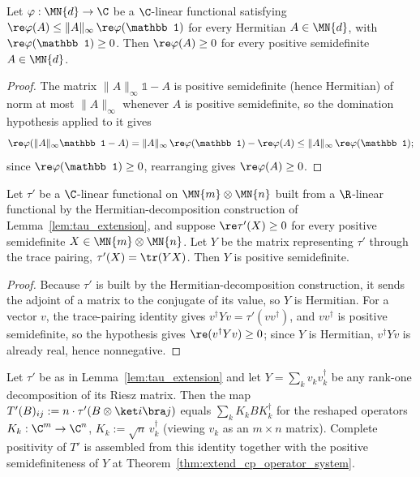 \begin{lemma}
    \label{lem:tau_nonneg}
    \leanok
    Let $\varphi:\MN{d}\to\C$ be a $\C$-linear functional satisfying
    $\re\varphi(A)\le\|A\|_\infty\,\re\varphi(\mathbb1)$ for every Hermitian
    $A\in\MN{d}$, with $\re\varphi(\mathbb1)\ge0$. Then $\re\varphi(A)\ge0$ for
    every positive semidefinite $A\in\MN{d}$.
\end{lemma}

\begin{proof}\leanok
    The matrix $\|A\|_\infty\mathbb1-A$ is positive semidefinite (hence
    Hermitian) of norm at most $\|A\|_\infty$ whenever $A$ is positive
    semidefinite, so the domination hypothesis applied to it gives
    \[
        \re\varphi(\|A\|_\infty\mathbb1-A)
        =\|A\|_\infty\,\re\varphi(\mathbb1)-\re\varphi(A)
        \le\|A\|_\infty\,\re\varphi(\mathbb1);
    \]
    since $\re\varphi(\mathbb1)\ge0$, rearranging gives $\re\varphi(A)\ge0$.
\end{proof}

\begin{lemma}
    \label{lem:riesz_psd}
    \leanok
    Let $\tau'$ be a $\C$-linear functional on $\MN{m}\otimes\MN{n}$ built
    from a $\R$-linear functional by the Hermitian-decomposition
    construction of Lemma~\ref{lem:tau_extension}, and suppose
    $\re\tau'(X)\ge0$ for every positive semidefinite
    $X\in\MN{m}\otimes\MN{n}$. Let $Y$ be the matrix representing $\tau'$
    through the trace pairing, $\tau'(X)=\tr(YX)$. Then $Y$ is positive
    semidefinite.
\end{lemma}

\begin{proof}\leanok
    Because $\tau'$ is built by the Hermitian-decomposition construction,
    it sends the adjoint of a matrix to the conjugate of its value, so $Y$
    is Hermitian. For a vector $v$, the trace-pairing identity gives
    $v^\dagger Yv=\tau'(vv^\dagger)$, and $vv^\dagger$ is positive
    semidefinite, so the hypothesis gives $\re(v^\dagger Yv)\ge0$; since $Y$
    is Hermitian, $v^\dagger Yv$ is already real, hence nonnegative.
\end{proof}

\begin{lemma}
    \label{lem:reconstructed_kraus}
    \leanok
    Let $\tau'$ be as in Lemma~\ref{lem:tau_extension} and let
    $Y=\sum_kv_kv_k^\dagger$ be any rank-one decomposition of its Riesz
    matrix. Then the map $T'(B)_{ij}:=n\cdot\tau'(B\otimes\ket i\bra j)$
    equals $\sum_kK_kBK_k^\dagger$ for the reshaped operators
    $K_k:\C^m\to\C^n$, $K_k:=\sqrt n\,v_k^\dagger$ (viewing $v_k$ as an
    $m\times n$ matrix). Complete positivity of $T'$ is assembled from this
    identity together with the positive semidefiniteness of $Y$ at
    Theorem~\ref{thm:extend_cp_operator_system}.
\end{lemma}


